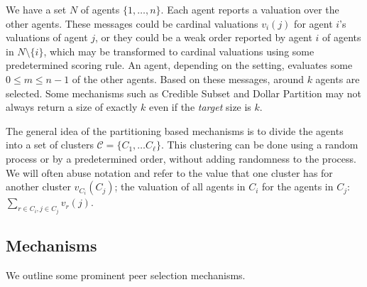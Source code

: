 \documentclass[letterpaper]{article}
\newcommand{\clusterset}{\ensuremath{\mathcal{C}}}
\begin{document}

We have a set $N$ of agents $\{1,\ldots, n\}$. Each agent reports a valuation over the other agents. These messages could be cardinal valuations $v_i(j)$ for agent $i$'s valuations of agent $j$, or they could be a weak order reported by agent $i$ of agents in $N\setminus \{i\}$, which may be transformed to cardinal valuations using some predetermined scoring rule.
An agent, depending on the setting, evaluates some $0 \leq m \leq n-1$ of the other agents.
Based on these messages, around $k$ agents are selected.
Some mechanisms such as Credible Subset and Dollar Partition may not always return a size of exactly $k$ even if the \emph{target} size is $k$.



The general idea of the partitioning based mechanisms is to divide the agents into a set of clusters $\clusterset = \{C_1, \ldots C_{\ell}\}$. This clustering can be done using a random process or by a predetermined order, without adding randomness to the process. We will often abuse notation and refer to the value that one cluster has for another cluster $v_{C_i}(C_j)$; the valuation of all agents in $C_i$ for the agents in $C_j$: $\sum_{r \in C_i, j \in C_j} v_r(j)$.

\subsection{Mechanisms}

We outline some prominent peer selection mechanisms.
\end{document}
